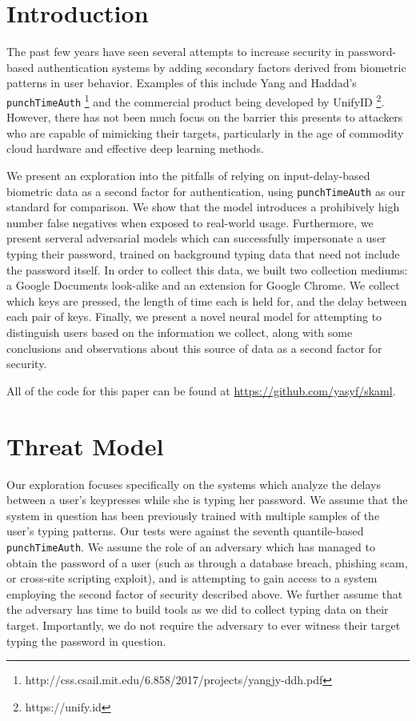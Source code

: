 \documentclass{amsart}
\begin{document}
\begin{multicols*}{2}
\section{Introduction}

The past few years have seen several attempts to increase security in password-based authentication systems by adding secondary factors derived from biometric patterns in user behavior. Examples of this include Yang and Haddad's \texttt{punchTimeAuth} \footnote{http://css.csail.mit.edu/6.858/2017/projects/yangjy-ddh.pdf} and the commercial product being developed by UnifyID \footnote{https://unify.id}. However, there has not been much focus on the barrier this presents to attackers who are capable of mimicking their targets, particularly in the age of commodity cloud hardware and effective deep learning methods.

We present an exploration into the pitfalls of relying on input-delay-based biometric data as a second factor for authentication, using \texttt{punchTimeAuth} as our standard for comparison. We show that the model introduces a prohibively high number false negatives when exposed to real-world usage. Furthermore, we present serveral adversarial models which can successfully impersonate a user typing their password, trained on background typing data that need not include the password itself. In order to collect this data, we built two collection mediums: a Google Documents look-alike and an extension for Google Chrome. We collect which keys are pressed, the length of time each is held for, and the delay between each pair of keys. Finally, we present a novel neural model for attempting to distinguish users based on the information we collect, along with some conclusions and observations about this source of data as a second factor for security.

All of the code for this paper can be found at \url{https://github.com/yasyf/skaml}.

\section{Threat Model}

Our exploration focuses specifically on the systems which analyze the delays between a user's keypresses while she is typing her password. We assume that the system in question has been previously trained with multiple samples of the user's typing patterns. Our tests were against the seventh quantile-based \texttt{punchTimeAuth}. We assume the role of an adversary which has managed to obtain the password of a user (such as through a database breach, phishing scam, or cross-site scripting exploit), and is attempting to gain access to a system employing the second factor of security described above. We further assume that the adversary has time to build tools as we did to collect typing data on their target. Importantly, we do not require the adversary to ever witness their target typing the password in question.


\end{multicols*}
\end{document}
